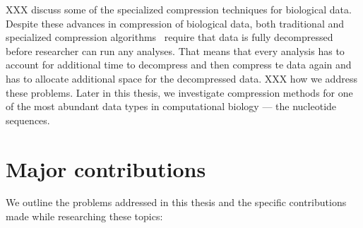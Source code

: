 XXX discuss some of the specialized compression techniques for biological data. Despite these advances in compression of biological data, both traditional and specialized compression algorithms~\cite{BAM,CRAM,Quip,SCALCE} require that data is fully decompressed before researcher can run any analyses. That means that every analysis has to account for additional time to decompress and then compress te data again and has to allocate additional space for the decompressed data. XXX how we address these problems. Later in this thesis, we investigate compression methods for one of the most abundant data types in computational biology --- the nucleotide sequences.



\section{Major contributions}

We outline the problems addressed in this thesis and the specific contributions made while researching these topics:

